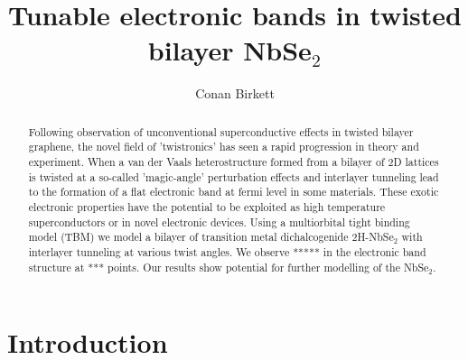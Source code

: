 \documentclass[12pt]{report} %
\title{\textbf{Tunable electronic bands in twisted bilayer NbSe$_2$}}
\author{Conan Birkett}
\affil{Department of Physics, University of Bath, Bath BA2 7AY, United Kingdom}
\begin{document}
\maketitle
\begin{abstract}
  Following observation of unconventional superconductive effects in twisted bilayer graphene, the novel field of 'twistronics' has seen a rapid progression in theory and experiment. When a van der Vaals heterostructure formed from a bilayer of 2D lattices is twisted at a so-called 'magic-angle' perturbation effects and interlayer tunneling lead to the formation of a flat electronic band at fermi level in some materials. These exotic electronic properties have the potential to be exploited as high temperature superconductors or in novel electronic devices. Using a multiorbital tight binding model (TBM) we model a bilayer of transition metal dichalcogenide 2H-NbSe$_2$ with interlayer tunneling at various twist angles. We observe ***** in the electronic band structure at *** points. Our results show potential for further modelling of the NbSe$_2$.
\end{abstract}

\newpage

\section*{Introduction}
\end{document}
